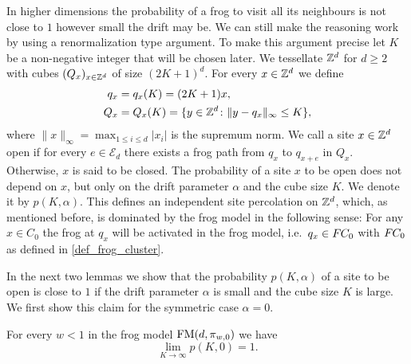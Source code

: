 In higher dimensions the probability of a frog to visit all its neighbours is not close to $1$ however small the drift may be. We can still make the reasoning work by using a renormalization type argument. 
To make this argument precise let $K$ be a non-negative integer that will be chosen later. We tessellate $\mathbb{Z}^d$ for $d \geq 2$ with cubes $(Q_x)_{x \in \mathbb{Z}^d}$ of size $(2K+1)^d$. For every $x \in \mathbb{Z}^d$ we define
\begin{align}\label{def_box}
\begin{split}
 q_x &= q_x(K) = (2K+1)x,\\
 Q_x &= Q_x(K) = \{y \in \mathbb{Z}^d \colon \lVert y-q_x \rVert_{\infty} \leq K\}, 
\end{split}
\end{align}
where $\lVert x \rVert_{\infty} = \max_{1 \leq i \leq d}{\lvert x_i \rvert}$ is the supremum norm. 
We call a site $x \in \mathbb{Z}^d$ open if for every $e \in \mathcal{E}_d$ there exists a frog path from $q_x$ to $q_{x + e}$ in $Q_x$. Otherwise, $x$ is said to be closed. 
The probability of a site $x$ to be open does not depend on $x$, but only on the drift parameter $\alpha$ and the cube size $K$. We denote it by $p(K, \alpha)$. This defines an independent site percolation on $\mathbb{Z}^d$, which, as mentioned before, is dominated by the frog model in the following sense: For any $x \in C_0$ the frog at $q_x$ will be activated in the frog model, i.e.~$q_x \in F\hspace{-0.04em}C_0$ with $F\hspace{-0.04em}C_0$ as defined in \eqref{def_frog_cluster}. 

In the next two lemmas we show that the probability $p(K,\alpha)$ of a site to be open is close to $1$ if the drift parameter $\alpha$ is small and the cube size $K$ is large. We first show this claim for the symmetric case $\alpha=0$.

\begin{lemma} \label{lemma_recurrence_cube_size}
For every $w<1$ in the frog model $\operatorname{FM}(d, \pi_{w,0})$ we have
 \begin{equation*}
  \lim_{K \to \infty} p(K, 0) =1.
 \end{equation*}
\end{lemma}

